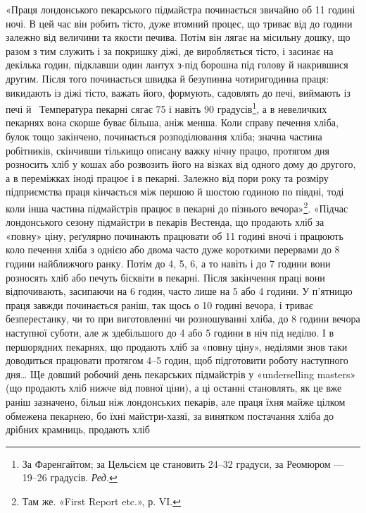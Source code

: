 «Праця лондонського пекарського підмайстра починається
звичайно об 11 годині ночі. В цей час він робить тісто, дуже втомний
процес, що триває від  до  години залежно від величини
та якости печива. Потім він лягає на місильну дошку, що разом
з тим служить і за покришку діжі, де виробляється тісто, і засинає
на декілька годин, підклавши один лантух з-під борошна під
голову й накрившися другим. Після того починається швидка й
безупинна чотиригодинна праця: викидають із діжі тісто, важать
його, формують, садовлять до печі, виймають із печі й~ Температура
пекарні сягає 75 і навіть 90 градусів\footnote*{
За Фаренгайтом; за Цельсієм це становить 24--32 градуси, за
Реомюром — 19--26 градусів. \emph{Ред.}
}, а в невеличких пекарнях
вона скорше буває більша, аніж менша. Коли справу печення
хліба, булок тощо закінчено, починається розподілювання хліба;
значна частина робітників, скінчивши тількищо описану важку
нічну працю, протягом дня розносить хліб у кошах або розвозить
його на візках від одного дому до другого, а в переміжках іноді працює
і в пекарні. Залежно від пори року та розміру підприємства
праця кінчається між першою й шостою годиною по півдні, тоді коли
інша частина підмайстрів працює в пекарні до пізнього вечора»\footnote{
Там же. «First Report etc.», р. VI.
}.
«Підчас лондонського сезону підмайстри в пекарів Вестенда, що
продають хліб за «повну» ціну, реґулярно починають працювати
об 11 годині вночі і працюють коло печення хліба з однією або
двома часто дуже короткими перервами до 8 години найближчого
ранку. Потім до 4, 5, 6, а то навіть і до 7 години вони розносять
хліб або печуть бісквіти в пекарні. Після закінчення праці вони
відпочивають, засипаючи на 6 годин, часто лише на 5 або 4 години.
У п’ятницю праця завжди починається раніш, так щось о 10 годині
вечора, і триває безперестанку, чи то при виготовленні чи розношуванні
хліба, до 8 години вечора наступної суботи, але ж здебільшого
до 4 або 5 години в ніч під неділю. І в першорядних
пекарнях, що продають хліб за «повну ціну», неділями знов таки
доводиться працювати протягом 4--5 годин, щоб підготовити
роботу наступного дня\dots{} Ще довший робочий день пекарських
підмайстрів у «underselling masters» (що продають хліб нижче
від повної ціни), а ці останні становлять, як це вже раніш зазначено,
більш ніж  лондонських пекарів, але праця їхня
майже цілком обмежена пекарнею, бо їхні майстри-хазяї, за
винятком постачання хліба до дрібних крамниць, продають хліб
\parbreak{}  %
